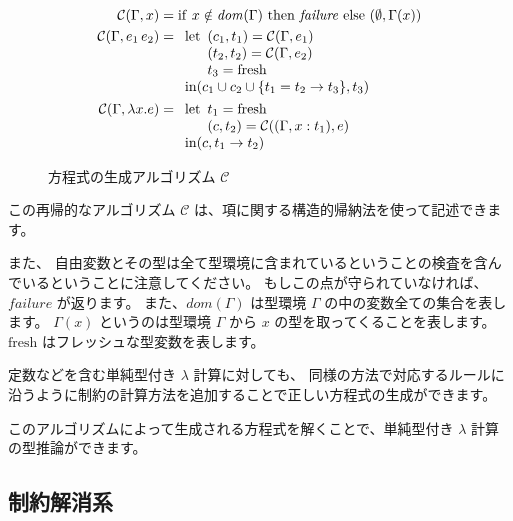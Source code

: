 \begin{figure}[htbp]
 \begin{align*}
  \mathcal{C}(\Gamma, x) &=
   \mathrm{if} ~ x \notin \mathit{dom}(\Gamma) ~
   \mathrm{then} ~ \mathit{failure} ~
   \mathrm{else} ~ (\emptyset, \Gamma(x)) \\
  \mathcal{C}(\Gamma, e_1 \, e_2) &=
  \begin{array}[t]{l}
   \mathrm{let}
    \begin{array}[t]{l}
     (c_1, t_1) = \mathcal{C}(\Gamma, e_1) \\
     (t_2, t_2) = \mathcal{C}(\Gamma, e_2) \\
     t_3 = \mathrm{fresh}
    \end{array} \\
   \mathrm{in} (c_1 \cup c_2 \cup \{t_1 = t_2 \to t_3\}, t_3)
  \end{array} \\
  \mathcal{C}(\Gamma, \lambda x . e) &=
  \begin{array}[t]{l}
   \mathrm{let}
    \begin{array}[t]{l}
     t_1 = \mathrm{fresh} \\
     (c, t_2) = \mathcal{C}((\Gamma, x : t_1), e)
    \end{array} \\
   \mathrm{in} (c, t_1 \to t_2)
  \end{array}
 \end{align*}
 \caption{方程式の生成アルゴリズム $\mathcal C$}
 \label{fig:algorithm-c}
\end{figure}

この再帰的なアルゴリズム $\mathcal C$ は、項に関する構造的帰納法を使って記述できます。

また、
自由変数とその型は全て型環境に含まれているということの検査を含んでいるということに注意してください。
もしこの点が守られていなければ、$\mathit{failure}$ が返ります。
また、$\mathit{dom}(\Gamma)$ は型環境 $\Gamma$ の中の変数全ての集合を表します。
$\Gamma(x)$ というのは型環境 $\Gamma$ から $x$ の型を取ってくることを表します。
$\mathrm{fresh}$ はフレッシュな型変数を表します。

定数などを含む単純型付き $\lambda$ 計算に対しても、
同様の方法で対応するルールに沿うように制約の計算方法を追加することで正しい方程式の生成ができます。

このアルゴリズムによって生成される方程式を解くことで、単純型付き $\lambda$ 計算の型推論ができます。

\subsection{制約解消系}

